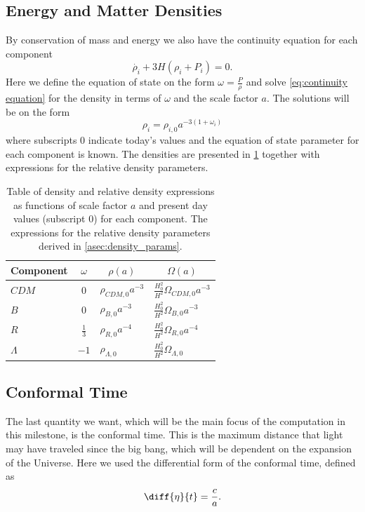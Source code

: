 \documentclass[10pt,a4paper]{article}
\begin{document}
\subsection{Energy and Matter Densities}
\label{subsec:Theory/densities}
By conservation of mass and energy we also have the continuity equation for each component
%
\begin{equation}
    \dot{\rho_i} + 3H \left(\rho_i + P_i \right) = 0.
    \label{eq:continuity equation}
\end{equation}
%
Here we define the equation of state on the form $\omega = \frac{P}{\rho}$ and solve \cref{eq:continuity equation} for the density in terms of $\omega$ and the scale factor $a$. The solutions will be on the form
%
\begin{equation}
    \rho_i = \rho_{i,0} a^{-3(1+\omega_i)}
    \label{eq:rho_i(a,w)}
\end{equation}
%
where subscripts $0$ indicate today's values and the equation of state parameter for each component is known. The densities are presented in \cref{tab:densities} together with expressions for the relative density parameters.
%
\begin{table}[ht]
    \centering
    \begin{tabular}{|l|c|l|l|}
    \hline
    Component & $\omega$      & \multicolumn{1}{c|}{$\rho(a)$} & \multicolumn{1}{c|}{$\Omega(a)$}        \\[3pt] \hline
    $CDM$     & $0$           & $\rho_{CDM,0}a^{-3}$           & $\frac{H_0^2}{H^2}\Omega_{CDM,0}a^{-3}$ \\[3pt] \hline
    $B$       & $0$           & $\rho_{B,0}a^{-3}$             & $\frac{H_0^2}{H^2}\Omega_{B,0}a^{-3}$   \\[3pt] \hline
    $R$       & $\frac{1}{3}$ & $\rho_{R,0}a^{-4}$             & $\frac{H_0^2}{H^2}\Omega_{R,0}a^{-4}$   \\[3pt] \hline
    $\Lambda$ & $-1$          & $\rho_{\Lambda,0}$             & $\frac{H_0^2}{H^2}\Omega_{\Lambda,0}$   \\[3pt] \hline
    \end{tabular}
    \caption{Table of density and relative density expressions as functions of scale factor $a$ and present day values (subscript $0$) for each component. The expressions for the relative density parameters derived in \cref{asec:density_params}.}
    \label{tab:densities}
\end{table}
%
\subsection{Conformal Time}
\label{subsce:Theory/Conformal Time}
The last quantity we want, which will be the main focus of the computation in this milestone, is the conformal time. This is the maximum distance that light may have traveled since the big bang, which will be dependent on the expansion of the Universe. Here we used the differential form of the conformal time, defined as 
%
\begin{equation}
    \diff{\eta}{t} = \frac{c}{a}.
    \label{eq:eta_diff}
\end{equation}
%
\end{document}
